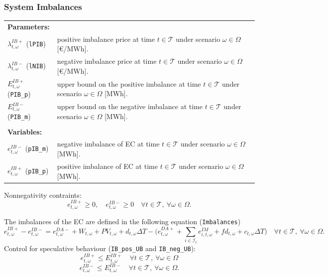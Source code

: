 \subsubsection{System Imbalances}

\begin{tabularx}{\textwidth}{l X}
\textbf{Parameters:} \\
$\lambda^{IB+}_{t, \omega}$ (\texttt{lPIB}) & positive imbalance price at time $t \in \mathcal{T}$ under scenario $\omega \in \Omega$ [\euro/MWh]. \\
$\lambda^{IB-}_{t, \omega}$ (\texttt{lNIB}) & negative imbalance price at time $t \in \mathcal{T}$ under scenario $\omega \in \Omega$ [\euro/MWh]. \\
$E^{IB+}_{t, \omega}$ (\texttt{PIB\_p}) & upper bound on the positive imbalance at time $t \in \mathcal{T}$ under scenario $\omega \in \Omega$ [MWh]. \\
$E^{IB-}_{t, \omega}$ (\texttt{PIB\_m}) & upper bound on the negative imbalance at time $t \in \mathcal{T}$ under scenario $\omega \in \Omega$ [MWh]. \\
\\

\textbf{Variables:} \\
$e^{IB-}_{t, \omega}$ (\texttt{pIB\_m}) & negative imbalance of EC at time $t \in \mathcal{T}$ under scenario $\omega \in \Omega$ [MWh]. \\
$e^{IB+}_{t, \omega}$ (\texttt{pIB\_p}) & positive imbalance of EC at time $t \in \mathcal{T}$ under scenario $\omega \in \Omega$ [MWh]. \\
\end{tabularx}

Nonnegativity contraints:
\begin{equation} \label{EQ:IBVarDef1}
    e_{t, \omega}^{IB+} \geq 0, \quad e_{t, \omega}^{IB-} \geq 0 \quad \forall t \in \mathcal{T}, \ \forall \omega \in \Omega.
\end{equation}

The imbalances of the EC are defined in the following equation (\verb|Imbalances|)
\begin{equation} \label{EQ:IBDef1}
    e^{IB+}_{t, \omega} - e^{IB-}_{t, \omega} = e^{DA-}_{t, \omega} + W_{t, \omega} + PV_{t, \omega} + d_{t, \omega} \Delta T - \Big (e^{DA+}_{t, \omega} + \sum_{i \in \mathcal{I}_t} e^{IM}_{i, t, \omega} + fd_{t, \omega} + c_{t, \omega} \Delta T \Big ) \quad \forall t \in \mathcal{T}, \ \forall \omega \in \Omega.
\end{equation}
Control for speculative behaviour (\verb|IB_pos_UB| and \verb|IB_neg_UB|):
\begin{equation} \label{EQ:VPP_IB_MAX1}
	e_{t, \omega}^{IB+} \leq E_{t, \omega}^{IB+} \quad \forall t \in \mathcal{T}, \ \forall \omega \in \Omega
\end{equation}
\begin{equation} \label{EQ:VPP_IB_MIN1}
	e_{t, \omega}^{IB-} \leq E_{t, \omega}^{IB-} \quad \forall t \in \mathcal{T}, \ \forall \omega \in \Omega.
\end{equation}

